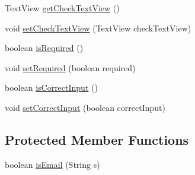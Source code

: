 \begin{DoxyCompactItemize}
\item 
Text\+View \hyperlink{classcom_1_1example_1_1loginui_1_1_field_a5719509b2b05db8000637d3bc40f13f2}{get\+Check\+Text\+View} ()
\item 
void \hyperlink{classcom_1_1example_1_1loginui_1_1_field_a7e2c1e43206bc45c4685a2707c1c49b4}{set\+Check\+Text\+View} (Text\+View check\+Text\+View)
\item 
boolean \hyperlink{classcom_1_1example_1_1loginui_1_1_field_a16cda5d55c59d66ecdc2e72e4e873662}{is\+Required} ()
\item 
void \hyperlink{classcom_1_1example_1_1loginui_1_1_field_ae74fd4f0125bdcd4693f228ce0bef35e}{set\+Required} (boolean required)
\item 
boolean \hyperlink{classcom_1_1example_1_1loginui_1_1_field_abd39acfcffe697a5df65f4aef54b3181}{is\+Correct\+Input} ()
\item 
void \hyperlink{classcom_1_1example_1_1loginui_1_1_field_ad78fc604d3d5debc9a8813d13e952f30}{set\+Correct\+Input} (boolean correct\+Input)
\end{DoxyCompactItemize}
\subsection*{Protected Member Functions}
\begin{DoxyCompactItemize}
\item 
boolean \hyperlink{classcom_1_1example_1_1loginui_1_1_field_aa6b2169b6e03936562eb1c72eb951ae8}{is\+Email} (String s)
\end{DoxyCompactItemize}


